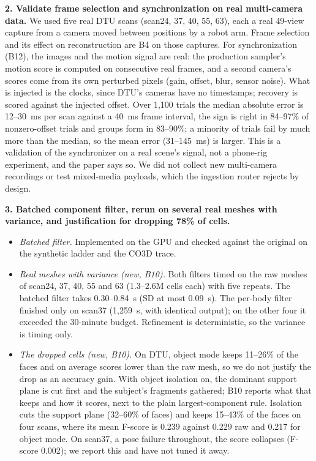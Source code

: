 \documentclass[11pt,a4paper]{article}
\newcommand{\request}[1]{\par\medskip\noindent\textbf{#1}}
\begin{document}
\request{2. Validate frame selection and synchronization on real multi-camera data.}
We used five real DTU scans (scan24, 37, 40, 55, 63), each a real 49-view
capture from a camera moved between positions by a robot arm. Frame selection
and its effect on reconstruction are B4 on those captures. For synchronization (B12), the
images and the motion signal are real: the
production sampler's motion score is computed on consecutive real frames, and a
second camera's scores come from its own perturbed pixels (gain, offset, blur,
sensor noise). What is injected is the clocks, since DTU's cameras have no
timestamps; recovery is scored against the injected offset. Over 1,100 trials
the median absolute error is 12--30~ms per scan against a 40~ms frame interval,
the sign is right in 84--97\% of nonzero-offset trials and groups form in 83--90\%;
a minority of trials fail by much more than the median, so the mean error
(31--145~ms) is larger. This is a
validation of the synchronizer on a real scene's signal, not a phone-rig
experiment, and the paper says so. We did not collect new multi-camera
recordings or test mixed-media payloads, which the ingestion router rejects by
design.

\request{3. Batched component filter, rerun on several real meshes with variance, and
justification for dropping 78\% of cells.}

\begin{itemize}
\item \textit{Batched filter.} Implemented on the GPU and
  checked against the original on the synthetic ladder and the CO3D trace.
\item \textit{Real meshes with variance (new, B10).} Both filters timed on the raw meshes
  of scan24, 37, 40, 55 and 63 (1.3--2.6M cells each) with five repeats. The
  batched filter takes 0.30--0.84~s (SD at most 0.09~s). The per-body filter
  finished only on scan37 (1,259~s, with identical output); on the other four
  it exceeded the 30-minute budget. Refinement is deterministic, so the
  variance is timing only.
\item \textit{The dropped cells (new, B10).} On DTU, object mode keeps 11--26\% of the
  faces and on average scores lower than the raw mesh, so we do not justify the drop as an
  accuracy gain. With object isolation on, the dominant support plane is cut
  first and the subject's fragments gathered; B10 reports what that keeps and
  how it scores, next to the plain largest-component rule. Isolation cuts the
  support plane (32--60\% of faces) and keeps 15--43\% of the faces on four scans,
  where its mean F-score is 0.239 against 0.229 raw and 0.217 for object mode.
  On scan37, a pose failure throughout, the score collapses (F-score 0.002); we
  report this and have not tuned it away.
\end{itemize}
\end{document}

